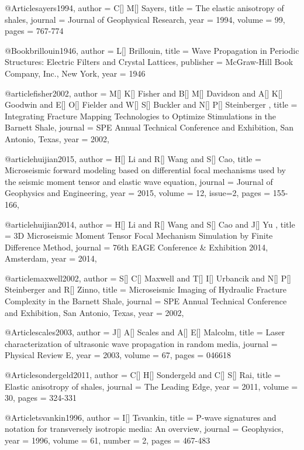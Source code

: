 @Article{sayers1994,
  author = 	 {C[] M[] Sayers},
  title = 	 {The elastic anisotropy of shales},
  journal = 	 {Journal of Geophysical Research},
  year = 	 1994,
  volume = 	 99,
  pages = 	 {767-774}}

@Book{brillouin1946,
  author =	 {L[] Brillouin},
  title =	 {Wave Propagation in Periodic Structures: Electric Filters and Crystal Lattices},
  publisher =	 {McGraw-Hill Book Company, Inc., New York},
  year =	 1946
}

@article{fisher2002,
  author =	 {M[] K[] Fisher and B[] M[] Davidson and  A[] K[]  Goodwin and E[] O[]  Fielder and W[] S[] Buckler and  N[] P[] Steinberger },
  title =	 {Integrating Fracture Mapping Technologies to Optimize Stimulations in the Barnett Shale},
  journal = 	 {SPE Annual Technical Conference and Exhibition, San Antonio, Texas},
  year = 	 2002,
}

@article{huijian2015,
  author =	 {H[] Li and R[] Wang and S[] Cao},
  title =	 {Microseismic forward modeling based on differential focal mechanisms used by the seismic moment tensor and elastic wave equation},
  journal = 	 {Journal of Geophysics and Engineering},
  year = 	 2015,
  volume =	 12,
  issue=2,
  pages =	 {155-166},
}



@article{huijian2014,
  author =	 {H[] Li and R[] Wang and S[] Cao and J[] Yu },
  title =	 {3{D} Microseismic Moment Tensor Focal Mechanism Simulation by Finite Difference Method},
  journal = 	 {76th EAGE Conference \& Exhibition 2014, Amsterdam},
  year = 	 2014,
}

@article{maxwell2002,
  author =	 {S[] C[] Maxwell and T[] I[] Urbancik and  N[] P[] Steinberger and R[] Zinno},
  title =	 {Microseismic Imaging of Hydraulic Fracture Complexity in the Barnett Shale},
  journal = 	 {SPE Annual Technical Conference and Exhibition, San Antonio, Texas},
  year = 	 2002,
}


@Article{scales2003,
  author = 	 {J[] A[] Scales and A[] E[] Malcolm},
  title = 	 { Laser characterization of ultrasonic wave propagation in random media},
  journal = 	 {Physical Review E},
  year = 	 2003,
  volume = 	 67,
  pages = 	 {046618}}


@Article{sondergeld2011,
  author = 	 {C[] H[] Sondergeld and C[] S[] Rai},
  title = 	 {Elastic anisotropy of shales},
  journal = 	 {The Leading Edge},
  year = 	 2011,
  volume = 	 30,
  pages = 	 {324-331}}


@Article{tsvankin1996,
  author = 	 {I[] Tsvankin},
  title = 	 {P-wave signatures and notation for transversely isotropic media: An overview},
  journal = 	 {Geophysics},
  year = 	 1996,
  volume = 	 61,
  number = 2,
  pages = 	 {467-483}}


